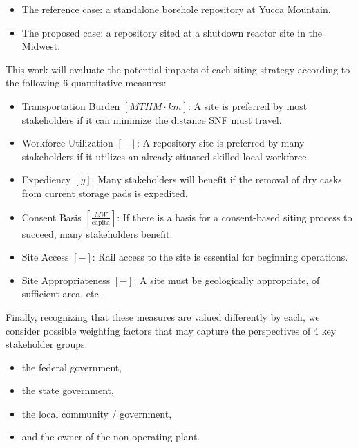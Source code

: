 \begin{itemize}
        \item The reference case: a standalone borehole repository at Yucca Mountain.  
        \item The proposed case: a repository sited at a shutdown reactor site 
                in the Midwest.

\end{itemize}

 This work will evaluate the potential impacts of each siting strategy according 
to the following 6 quantitative measures:

\begin{itemize}
        \item Transportation Burden $[MTHM \cdot km]$: A site is preferred by 
                most stakeholders if it can minimize the distance \gls{SNF} 
                must travel.
        \item Workforce Utilization $[-]$: A repository site is preferred by 
                many stakeholders if it utilizes an already situated skilled local 
                workforce. 
        \item Expediency $[y]$: Many stakeholders will benefit if the removal 
                of dry casks from current storage pads is expedited.
        \item Consent Basis $[\frac{MW}{\mbox{capita}}]$: If there is a basis for a consent-based 
                siting process to succeed, many stakeholders benefit.
        \item Site Access $[-]$: Rail access to the site is essential for 
                beginning operations.
        \item Site Appropriateness $[-]$: A site must be geologically 
                appropriate, of sufficient area, etc.
\end{itemize}

Finally, recognizing that these measures are valued differently by each, we
consider possible weighting factors that may capture the perspectives of 4 key
stakeholder groups:

\begin{itemize}
        \item the federal government,
        \item the state government,
        \item the local community / government,
        \item and the owner of the non-operating plant.
\end{itemize}


